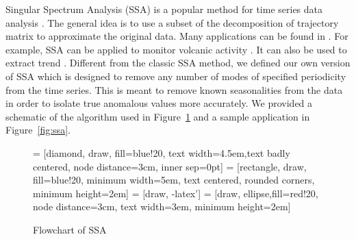 Singular Spectrum Analysis (SSA) is a popular method for time series
data analysis \cite{golyandina2013singular,golyandina2014basic}. The
general idea is to use a subset of the decomposition of trajectory
matrix to approximate the original data. Many applications can be found
in \cite{golyandina2013singular}. For example, SSA can be applied to
monitor volcanic activity \cite{bozzo2010relationship}. It can also be
used to extract trend \cite{alexandrov2008method}. Different from the
classic SSA method, we defined our own version of SSA which is designed
to remove any number of modes of specified periodicity from the time
series. This is meant to remove known seasonalities from the data in 
order to isolate true anomalous values more accurately. We provided a 
schematic of the algorithm used in Figure~\ref{fig:pcs} and a sample 
application in Figure~\ref{fig:ssa}.

\begin{figure}[ht]
    \centering
     = [diamond, draw, fill=blue!20, text width=4.5em,text badly centered, node distance=3cm, inner sep=0pt]
     = [rectangle, draw, fill=blue!20, minimum width=5em, text centered, rounded corners, minimum height=2em]
     = [draw, -latex']
     = [draw, ellipse,fill=red!20, node distance=3cm, text width=3em, minimum height=2em]
    \caption{Flowchart of SSA}
    \label{fig:pcs}
\end{figure}

